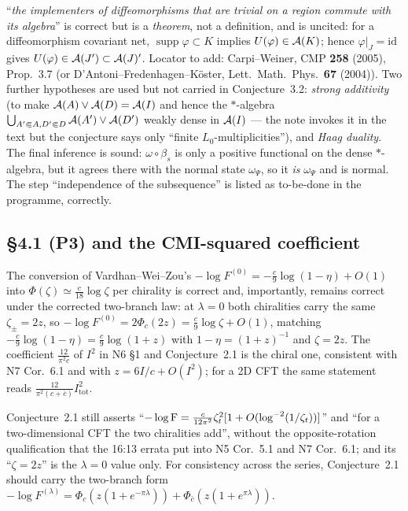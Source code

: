 \documentclass[11pt]{article}
\begin{document}
\begin{verdictgap}
``\emph{the implementers of diffeomorphisms that are trivial on a region commute with its algebra}'' is correct
but is a \emph{theorem}, not a definition, and is uncited: for a diffeomorphism covariant net,
$\operatorname{supp}\varphi\subset K$ implies $U(\varphi)\in\mathcal A(K)$; hence $\varphi|_J=\mathrm{id}$ gives
$U(\varphi)\in\mathcal A(J')\subset\mathcal A(J)'$.  Locator to add: Carpi--Weiner, CMP \textbf{258} (2005), Prop.~3.7 (or
D'Antoni--Fredenhagen--K\"oster, Lett.\ Math.\ Phys.\ \textbf{67} (2004)).  Two further hypotheses are used but
not carried in Conjecture~3.2: \emph{strong additivity} (to make $\mathcal A(A)\vee\mathcal A(D)=\mathcal A(I)$ and hence the
$*$-algebra $\bigcup_{A'\Subset A,D'\Subset D}\mathcal A(A')\vee\mathcal A(D')$ weakly dense in $\mathcal A(I)$ --- the note invokes it
in the text but the conjecture says only ``finite $L_0$-multiplicities''), and \emph{Haag duality}.  The final
inference is sound: $\omega\circ\beta_s$ is only a positive functional on the dense $*$-algebra, but it agrees
there with the normal state $\omega_\Psi$, so it \emph{is} $\omega_\Psi$ and is normal.  The step
``independence of the subsequence'' is listed as to-be-done in the programme, correctly.
\end{verdictgap}

\subsection{\S4.1 (P3) and the CMI-squared coefficient}
\begin{verdictok}
The conversion of Vardhan--Wei--Zou's $-\log F^{(0)}=-\frac c9\log(1-\eta)+O(1)$ into
$\Phi(\zeta)\simeq\frac c{18}\log\zeta$ per chirality is correct and, importantly, remains correct under the
corrected two-branch law: at $\lambda=0$ both chiralities carry the same $\zeta_\pm=2z$, so
$-\log F^{(0)}=2\Phi_c(2z)=\frac c9\log\zeta+O(1)$, matching $-\frac c9\log(1-\eta)=\frac c9\log(1+z)$ with
$1-\eta=(1+z)^{-1}$ and $\zeta=2z$.  The coefficient $\frac{12}{\pi^2c}$ of $I^2$ in N6 \S1 and Conjecture~2.1 is
the chiral one, consistent with N7 Cor.~6.1 and with $z=6I/c+O(I^2)$; for a 2D CFT the same statement reads
$\frac{12}{\pi^2(c+\bar c)}I_{\mathrm{tot}}^2$.
\end{verdictok}
\begin{verdictgap}
Conjecture~2.1 still asserts ``$-\log\operatorname{F}=\frac c{12\pi^2}\zeta_t^2[1+O(\log^{-2}(1/\zeta_t))]$'' and ``for a
two-dimensional CFT the two chiralities add'', without the opposite-rotation qualification that the 16:13 errata
put into N5 Cor.~5.1 and N7 Cor.~6.1; and its ``$\zeta=2z$'' is the $\lambda=0$ value only.  For consistency
across the series, Conjecture~2.1 should carry the two-branch form
$-\log F^{(\lambda)}=\Phi_c(z(1+e^{-\pi\lambda}))+\Phi_{\bar c}(z(1+e^{\pi\lambda}))$.
\end{verdictgap}
\end{document}
